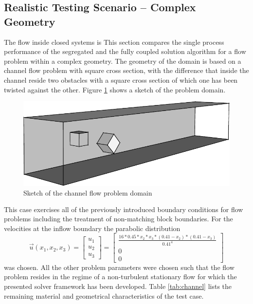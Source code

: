 \subsection{Realistic Testing Scenario -- Complex Geometry}

The flow inside closed systems is This section compares the single process performance of the segregated and the fully coupled solution algorithm for a flow problem within a complex geometry. The geometry of the domain is based on a channel flow problem with square cross section, with the difference that inside the channel reside two obstacles with a square cross section of which one has been twisted against the other. Figure \ref{fig:sketch} shows a sketch of the problem domain. 

\begin{figure}
  \centering
  \includegraphics{./img/channel3d.pdf}
  \caption{Sketch of the channel flow problem domain}
  \label{fig:sketch}
\end{figure}

This case exercises all of the previously introduced boundary conditions for flow problems including the treatment of non-matching block boundaries. For the velocities at the inflow boundary the parabolic distribution
\begin{displaymath}
  \vec{u}(x_1,x_2,x_3) 
  =
\left[
  \begin{array}{ccc}
    u_1 \\
    u_2 \\
    u_3 
  \end{array}
\right]
  =
\left[
  \begin{array}{ccc}
    \frac{ 16 * 0.45 * x_2 * x_3 * \left( 0.41 - x_2 \right) * \left( 0.41 - x_3 \right)}{0.41^4}
    \\[0.9em]
    0 \\[0.3em]
    0 
  \end{array}
\right]
\end{displaymath}
was chosen. All the other problem parameters were chosen such that the flow problem resides in the regime of a non-turbulent stationary flow for which the presented solver framework has been developed. Table \ref{tab:channel} lists the remaining material and geometrical characteristics of the test case.

